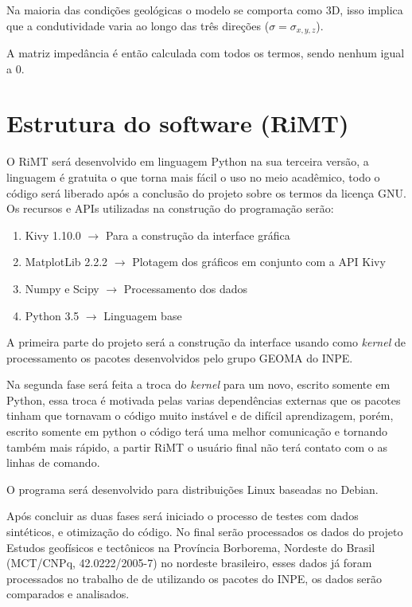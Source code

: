 	    Na maioria das condições geológicas o modelo se comporta como 3D, isso implica que a 
	    condutividade varia ao longo das três direções ($\sigma = \sigma_{x,y,z}$).
	    
	    A matriz impedância é então calculada com todos os termos, sendo nenhum igual a 0.
	    
	\section{Estrutura do software (RiMT)}
	    \label{rimt}

	    O RiMT será desenvolvido em linguagem Python na sua terceira versão, a
	    linguagem é gratuita o que torna mais fácil o uso no meio acadêmico, todo
	    o código será liberado após a conclusão do projeto sobre os termos da licença
	    GNU. 
	    Os recursos e APIs utilizadas na construção do programação serão:
	    
	    \begin{enumerate}
		\item Kivy 1.10.0 $\rightarrow$ Para a construção da interface gráfica
		\item MatplotLib 2.2.2 $\rightarrow$ Plotagem dos gráficos em conjunto com a API Kivy
		\item Numpy e Scipy $\rightarrow$ Processamento dos dados
		\item Python 3.5 $\rightarrow$ Linguagem base 
	    \end{enumerate}

	    A primeira parte do projeto será a construção da interface usando como \textit{kernel}
	    de processamento os pacotes desenvolvidos pelo grupo GEOMA \citeauthor{geoma} do INPE.
	    
	    Na segunda fase será feita a troca do \textit{kernel} para um novo, escrito
	    somente em Python, essa troca é motivada pelas varias dependências externas que os 
	    pacotes tinham que tornavam o código muito instável e de difícil aprendizagem, porém,
	    escrito somente em python o código terá uma melhor comunicação e tornando também 
	    mais rápido, a partir RiMT o usuário final não terá contato com o as linhas de comando.
	    
	    O programa será desenvolvido para distribuições Linux baseadas no Debian. 
	    
	    Após concluir as duas fases será iniciado o processo de testes com dados
	    sintéticos, e otimização do código. No final serão processados
	    os dados do projeto Estudos geofísicos e tectônicos na Província Borborema,
	    Nordeste do Brasil (MCT/CNPq, 42.0222/2005-7) no nordeste brasileiro, esses dados
	    já foram processados no trabalho de \citeauthor{tese_andrea} de \citeyearpar{tese_andrea}
	    utilizando os pacotes do INPE, os dados serão comparados e analisados.
